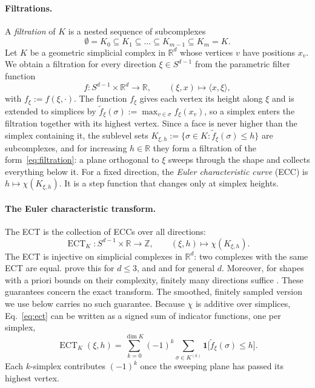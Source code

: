 \documentclass{article}
\newcommand{\R}{\mathbb{R}}
\newcommand{\Z}{\mathbb{Z}}
\newcommand{\ECT}{\operatorname{ECT}}
\begin{document}
\paragraph{Filtrations.}
A \emph{filtration} of $K$ is a nested sequence of subcomplexes
\begin{equation}
  \emptyset = K_0 \subseteq K_1 \subseteq \dots \subseteq K_{m-1} \subseteq K_m = K.
  \label{eq:filtration}
\end{equation}
Let $K$ be a geometric simplicial complex in $\R^d$ whose vertices $v$ have positions $x_v$. We obtain a filtration for every direction $\xi\in S^{d-1}$ from the parametric filter function
\begin{equation}
  f\colon S^{d-1}\times\R^d \to \R, \qquad (\xi, x) \mapsto \langle x, \xi\rangle,
  \label{eq:filter}
\end{equation}
with $f_\xi := f(\xi,\cdot)$. The function $f_\xi$ gives each vertex its height along $\xi$ and is extended to simplices by $\tilde f_\xi(\sigma) := \max_{v\in\sigma} f_\xi(x_v)$, so a simplex enters the filtration together with its highest vertex. Since a face is never higher than the simplex containing it, the sublevel sets $K_{\xi,h} := \{\sigma\in K : \tilde f_\xi(\sigma) \le h\}$ are subcomplexes, and for increasing $h\in\R$ they form a filtration of the form~\eqref{eq:filtration}: a plane orthogonal to $\xi$ sweeps through the shape and collects everything below it. For a fixed direction, the \emph{Euler characteristic curve} (ECC) is $h\mapsto \chi(K_{\xi,h})$. It is a step function that changes only at simplex heights.

\paragraph{The Euler characteristic transform.}
The ECT \citep{turner2014pht} is the collection of ECCs over all directions:
\begin{equation}
  \ECT_K\colon S^{d-1}\times\R \to \Z, \qquad (\xi,h) \mapsto \chi(K_{\xi,h}).
  \label{eq:ect}
\end{equation}
The ECT is injective on simplicial complexes in $\R^d$: two complexes with the same ECT are equal. \citet{turner2014pht} prove this for $d\le 3$, and \citet{curry2022directions} and \citet{ghrist2018euler} for general $d$. Moreover, for shapes with a priori bounds on their complexity, finitely many directions suffice \citep{curry2022directions}. These guarantees concern the exact transform. The smoothed, finitely sampled version we use below carries no such guarantee. Because $\chi$ is additive over simplices, Eq.~\eqref{eq:ect} can be written as a signed sum of indicator functions, one per simplex,
\begin{equation}
  \ECT_K(\xi,h) = \sum_{k=0}^{\dim K} (-1)^k \sum_{\sigma\in K^{(k)}} \mathbf{1}\big[\tilde f_\xi(\sigma) \le h\big].
  \label{eq:ect-sum}
\end{equation}
Each $k$-simplex contributes $(-1)^k$ once the sweeping plane has passed its highest vertex.
\end{document}
